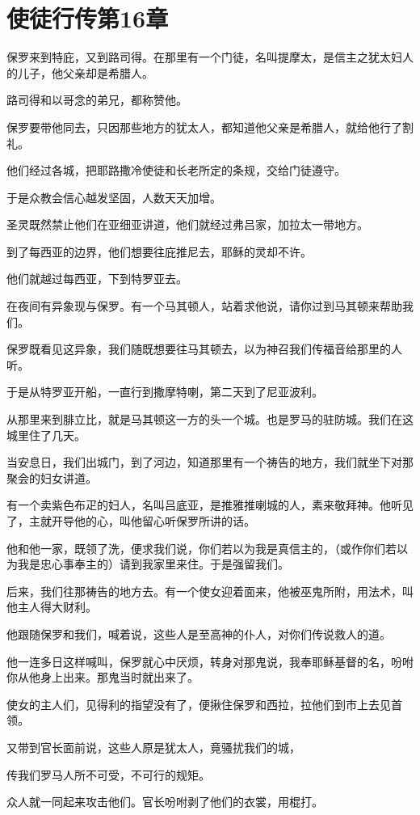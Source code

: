 \documentclass[12pt,oneside]{book}
\begin{document}
\chapter{使徒行传第16章}
保罗来到特庇，又到路司得。在那里有一个门徒，名叫提摩太，是信主之犹太妇人的儿子，他父亲却是希腊人。

路司得和以哥念的弟兄，都称赞他。

保罗要带他同去，只因那些地方的犹太人，都知道他父亲是希腊人，就给他行了割礼。

他们经过各城，把耶路撒冷使徒和长老所定的条规，交给门徒遵守。

于是众教会信心越发坚固，人数天天加增。

圣灵既然禁止他们在亚细亚讲道，他们就经过弗吕家，加拉太一带地方。

到了每西亚的边界，他们想要往庇推尼去，耶稣的灵却不许。

他们就越过每西亚，下到特罗亚去。

在夜间有异象现与保罗。有一个马其顿人，站着求他说，请你过到马其顿来帮助我们。

保罗既看见这异象，我们随既想要往马其顿去，以为神召我们传福音给那里的人听。

于是从特罗亚开船，一直行到撒摩特喇，第二天到了尼亚波利。

从那里来到腓立比，就是马其顿这一方的头一个城。也是罗马的驻防城。我们在这城里住了几天。

当安息日，我们出城门，到了河边，知道那里有一个祷告的地方，我们就坐下对那聚会的妇女讲道。

有一个卖紫色布疋的妇人，名叫吕底亚，是推雅推喇城的人，素来敬拜神。他听见了，主就开导他的心，叫他留心听保罗所讲的话。

他和他一家，既领了洗，便求我们说，你们若以为我是真信主的，（或作你们若以为我是忠心事奉主的）请到我家里来住。于是强留我们。

后来，我们往那祷告的地方去。有一个使女迎着面来，他被巫鬼所附，用法术，叫他主人得大财利。

他跟随保罗和我们，喊着说，这些人是至高神的仆人，对你们传说救人的道。

他一连多日这样喊叫，保罗就心中厌烦，转身对那鬼说，我奉耶稣基督的名，吩咐你从他身上出来。那鬼当时就出来了。

使女的主人们，见得利的指望没有了，便揪住保罗和西拉，拉他们到市上去见首领。

又带到官长面前说，这些人原是犹太人，竟骚扰我们的城，

传我们罗马人所不可受，不可行的规矩。

众人就一同起来攻击他们。官长吩咐剥了他们的衣裳，用棍打。
\end{document}
